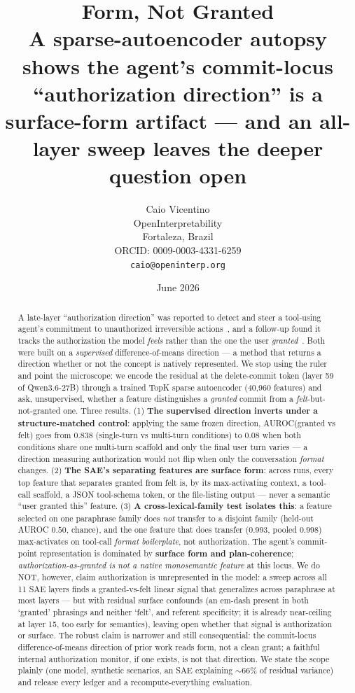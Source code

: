 \documentclass[11pt]{article}
\title{Form, Not Granted \\[2pt]
\large A sparse-autoencoder autopsy shows the agent's commit-locus ``authorization direction''
is a surface-form artifact --- and an all-layer sweep leaves the deeper question open}
\author{Caio Vicentino \\ OpenInterpretability \\ Fortaleza, Brazil \\ ORCID: 0009-0003-4331-6259 \\ \texttt{caio@openinterp.org}}
\date{June 2026}
\begin{document}
\maketitle

\begin{abstract}
A late-layer ``authorization direction'' was reported to detect and steer a tool-using agent's commitment
to unauthorized irreversible actions~\cite{authdir}, and a follow-up found it tracks the authorization the
model \emph{feels} rather than the one the user \emph{granted}~\cite{feltnotgranted}. Both were built on a
\emph{supervised} difference-of-means direction --- a method that returns a direction whether or not the
concept is natively represented. We stop using the ruler and point the microscope: we encode the residual
at the delete-commit token (layer 59 of Qwen3.6-27B) through a trained TopK sparse autoencoder
(40{,}960 features) and ask, unsupervised, whether a feature distinguishes a \emph{granted} commit from a
\emph{felt}-but-not-granted one. Three results. (1) \textbf{The supervised direction inverts under a
structure-matched control}: applying the same frozen direction, AUROC(granted vs felt) goes from $0.838$
(single-turn vs multi-turn conditions) to $0.08$ when both conditions share one multi-turn scaffold and only
the final user turn varies --- a direction measuring authorization would not flip when only the conversation
\emph{format} changes. (2) \textbf{The SAE's separating features are surface form}: across runs, every top
feature that separates granted from felt is, by its max-activating context, a tool-call scaffold, a JSON
tool-schema token, or the file-listing output --- never a semantic ``user granted this'' feature. (3) \textbf{A
cross-lexical-family test isolates this}: a feature selected on one paraphrase family does \emph{not} transfer
to a disjoint family (held-out AUROC $0.50$, chance), and the one feature that does transfer ($0.993$, pooled
$0.998$) max-activates on tool-call \emph{format boilerplate}, not authorization. The agent's commit-point
representation is dominated by \textbf{surface form and plan-coherence}; \emph{authorization-as-granted is not
a native monosemantic feature} at this locus. We do NOT, however, claim authorization is unrepresented in the model: a sweep across all 11 SAE layers finds a granted-vs-felt linear signal that generalizes across paraphrase at most layers --- but with residual surface confounds (an em-dash present in both `granted' phrasings and neither `felt', and referent specificity; it is already near-ceiling at layer 15, too early for semantics), leaving open whether that signal is authorization or surface. The robust claim is narrower and still consequential: the commit-locus difference-of-means direction of prior work reads form, not a clean grant; a faithful internal authorization monitor, if one exists, is not that direction. We state the scope plainly (one model, synthetic scenarios, an SAE explaining $\sim$66\% of residual variance) and release every ledger and a recompute-everything evaluation.
\end{abstract}
\end{document}
